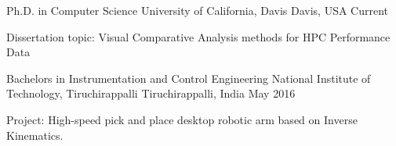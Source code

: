 

\begin{cventries}

  \cventry
    {Ph.D. in Computer Science} %
    {University of California, Davis} %
    {Davis, USA} %
    {Current} %
    {
      \begin{cvitems} %
        \item {Dissertation topic: Visual Comparative Analysis methods for HPC Performance Data}
      \end{cvitems}
    }
  \cventry
    {Bachelors in Instrumentation and Control Engineering} %
    {National Institute of Technology, Tiruchirappalli} %
    {Tiruchirappalli, India} %
    {May 2016} %
    {
      \begin{cvitems} %
        \item {Project: High-speed pick and place desktop robotic arm based on Inverse Kinematics. }
      \end{cvitems}
    }

\end{cventries}
